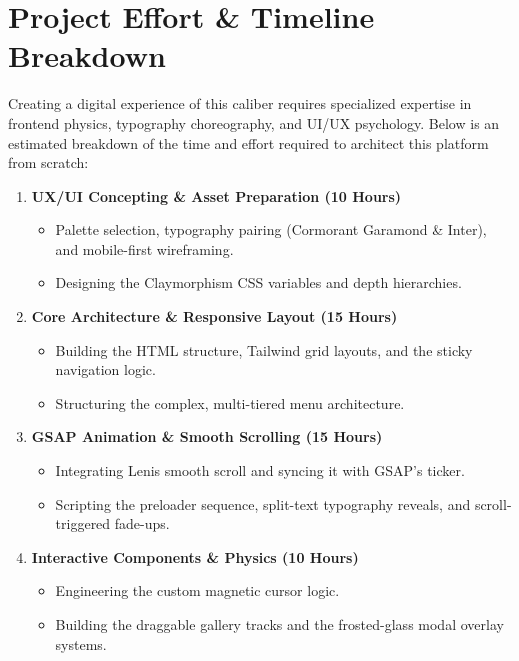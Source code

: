 \documentclass[11pt, a4paper]{article}
\begin{document}
\section{Project Effort \& Timeline Breakdown}
Creating a digital experience of this caliber requires specialized expertise in frontend physics, typography choreography, and UI/UX psychology. Below is an estimated breakdown of the time and effort required to architect this platform from scratch:

\begin{enumerate}[label=\textcolor{umuaccent}{\textbf{\arabic*.}}]
    \item \textbf{UX/UI Concepting \& Asset Preparation (10 Hours)}
    \begin{itemize}[label=\textcolor{umufg}{\textbullet}]
        \item Palette selection, typography pairing (Cormorant Garamond \& Inter), and mobile-first wireframing.
        \item Designing the Claymorphism CSS variables and depth hierarchies.
    \end{itemize}
    
    \item \textbf{Core Architecture \& Responsive Layout (15 Hours)}
    \begin{itemize}[label=\textcolor{umufg}{\textbullet}]
        \item Building the HTML structure, Tailwind grid layouts, and the sticky navigation logic.
        \item Structuring the complex, multi-tiered menu architecture.
    \end{itemize}
    
    \item \textbf{GSAP Animation \& Smooth Scrolling (15 Hours)}
    \begin{itemize}[label=\textcolor{umufg}{\textbullet}]
        \item Integrating Lenis smooth scroll and syncing it with GSAP's ticker.
        \item Scripting the preloader sequence, split-text typography reveals, and scroll-triggered fade-ups.
    \end{itemize}
    
    \item \textbf{Interactive Components \& Physics (10 Hours)}
    \begin{itemize}[label=\textcolor{umufg}{\textbullet}]
        \item Engineering the custom magnetic cursor logic.
        \item Building the draggable gallery tracks and the frosted-glass modal overlay systems.
    \end{itemize}
    

\end{enumerate}
\end{document}
